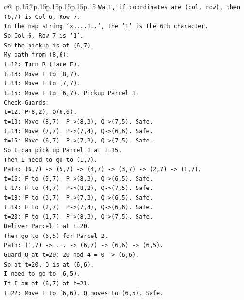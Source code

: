 \documentclass{article}
\begin{document}
{\begin{supertabular}{c@{$\;$}|p{.15\linewidth}@{}p{.15\linewidth}p{.15\linewidth}p{.15\linewidth}p{.15\linewidth}p{.15\linewidth}}
{{{\texttt{Wait, if coordinates are (col, row), then (6,7) is Col 6, Row 7.} \\
\texttt{In the map string `x....1..`, the '1' is the 6th character.} \\
\texttt{So Col 6, Row 7 is '1'.} \\
\texttt{So the pickup is at (6,7).} \\
\texttt{My path from (8,6):} \\
\texttt{t=12: Turn R (face E).} \\
\texttt{t=13: Move F to (8,7).} \\
\texttt{t=14: Move F to (7,7).} \\
\texttt{t=15: Move F to (6,7). Pickup Parcel 1.} \\
\texttt{Check Guards:} \\
\texttt{t=12: P(8,2), Q(6,6).} \\
\texttt{t=13: Move (8,7). P{-}>(8,3), Q{-}>(7,5). Safe.} \\
\texttt{t=14: Move (7,7). P{-}>(7,4), Q{-}>(6,6). Safe.} \\
\texttt{t=15: Move (6,7). P{-}>(7,3), Q{-}>(7,5). Safe.} \\
\texttt{So I can pick up Parcel 1 at t=15.} \\
\texttt{Then I need to go to (1,7).} \\
\texttt{Path: (6,7) {-}> (5,7) {-}> (4,7) {-}> (3,7) {-}> (2,7) {-}> (1,7).} \\
\texttt{t=16: F to (5,7). P{-}>(8,3), Q{-}>(6,5). Safe.} \\
\texttt{t=17: F to (4,7). P{-}>(8,2), Q{-}>(7,5). Safe.} \\
\texttt{t=18: F to (3,7). P{-}>(7,3), Q{-}>(6,5). Safe.} \\
\texttt{t=19: F to (2,7). P{-}>(7,4), Q{-}>(6,6). Safe.} \\
\texttt{t=20: F to (1,7). P{-}>(8,3), Q{-}>(7,5). Safe.} \\
\texttt{Deliver Parcel 1 at t=20.} \\
\texttt{Then go to (6,5) for Parcel 2.} \\
\texttt{Path: (1,7) {-}> ... {-}> (6,7) {-}> (6,6) {-}> (6,5).} \\
\texttt{Guard Q at t=20: 20 mod 4 = 0 {-}> (6,6).} \\
\texttt{So at t=20, Q is at (6,6).} \\
\texttt{I need to go to (6,5).} \\
\texttt{If I am at (6,7) at t=21.} \\
\texttt{t=22: Move F to (6,6). Q moves to (6,5). Safe.} \\
}}}
\end{supertabular}}
\end{document}
